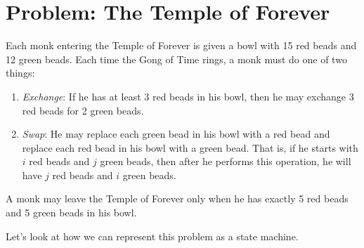 \documentclass[12pt]{article}
\begin{document}
\newpage
\section{Problem: The Temple of Forever}

Each monk entering the Temple of Forever is given a bowl with 15 red
beads and 12 green beads.  Each time the Gong of Time rings, a monk
must do one of two things:

\begin{enumerate}

\item {\em Exchange}: If he has at least 3 red beads in his bowl, then he may exchange 3
red beads for 2 green beads.

\item {\em Swap}: He may replace each green bead in his bowl with a red bead and
replace each red bead in his bowl with a green bead.
That is, if he starts with $i$ red beads and $j$ green beads, then after he
performs this operation, he will have $j$ red beads and $i$ green beads.

\end{enumerate}

\noindent A monk may leave the Temple of Forever only when he has
exactly 5 red beads and 5 green beads in his bowl.

Let's look at how we can represent this problem as a state machine.
\end{document}
